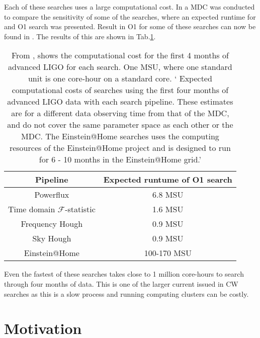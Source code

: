 Each of these searches uses a large computational cost. In \citep{walsh2016ComparisonMethods} a \gls{MDC} was conducted to compare the sensitivity of some of the searches, where an expected runtime for and O1 search was presented. Result in O1 for some of these searches can now be found in \citep{ligoscientificcollaborationandvirgocollaboration2017AllskySearch}.
The results of this are shown in Tab.\ref{searchcw:search:semi:cost}.
\begin{table}
	\centering
	\caption{From \citep{walsh2016ComparisonMethods}, shows the computational cost for the first 4 months of advanced \gls{LIGO} for each search. One \gls{MSU}, where one standard unit is one core-hour on a standard core. ` Expected computational costs of searches using the first four months of advanced \gls{LIGO} data with each search pipeline. These estimates are for a different data observing time from that of the \gls{MDC}, and do not cover the same parameter space as each other or the \gls{MDC}. The Einstein@Home searches uses the computing resources of the Einstein@Home project and is designed to run for 6 - 10 months in the Einstein@Home grid.'  \label{searchcw:search:semi:cost}}
	
	\bgroup
	\def\arraystretch{1.5}
	\centering
	\begin{tabular}{|c c|}
		\hline
		Pipeline & Expected runtume of O1 search \\
		\hline
		Powerflux & 6.8 MSU \\

		Time domain $\mathcal{F}$-statistic & 1.6 MSU\\

		Frequency Hough & 0.9 MSU \\

		Sky Hough & 0.9 MSU\\
		\hline
		Einstein@Home & 100-170 MSU\\
		\hline

	\end{tabular}
	\egroup
\end{table}
Even the fastest of these searches takes close to 1 million core-hours to search through four months of data.
This is one of the larger current issued in \gls{CW} searches as this is a slow process and running computing clusters can be costly.


\section{\label{searchcw:motivation}Motivation}

